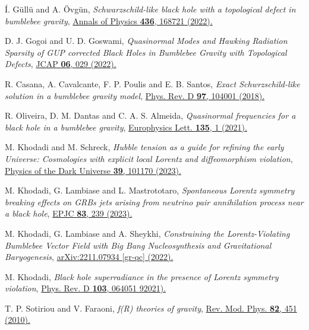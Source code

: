 \documentclass[aps,amsmath,amssymb,showpacs,showkeys]{revtex4}
\begin{document}
\begin{thebibliography}{99}
 \'I. G\"ull\"u and A. \"Ovg\"un, \textit{Schwarzschild-like black hole with a topological defect in bumblebee gravity}, \href{https://doi.org/10.1016/j.aop.2021.168721}{Annals of Physics \textbf{436}, 168721 (2022).}

D. J. Gogoi and U. D. Goswami, \textit{Quasinormal Modes and Hawking Radiation Sparsity of GUP corrected Black Holes in Bumblebee
Gravity with Topological Defects}, \href{https://iopscience.iop.org/article/10.1088/1475-7516/2022/06/029}{JCAP \textbf{06}, 029 (2022).}

R. Casana, A. Cavalcante, F. P. Poulis and E. B. Santos, \textit{Exact Schwrzschild-like solution in a bumblebee gravity model}, \href{https://doi.org/10.1103/PhysRevD.97.104001}{Phys. Rev. D \textbf{97}, 104001 (2018).}

R. Oliveira, D. M. Dantas and C. A. S. Almeida, \textit{Quasinormal frequencies for a black hole in a bumblebee gravity}, \href{https://iopscience.iop.org/article/10.1209/0295-5075/ac130c/pdf}{Europhysics Lett. \textbf{135}, 1 (2021).}


M. Khodadi and M. Schreck, \textit{Hubble tension as a guide for refining the early Universe: Cosmologies with explicit local Lorentz and diffeomorphism violation}, \href{https://www.sciencedirect.com/science/article/abs/pii/S2212686423000043?via%3Dihub}{Physics of the Dark Universe \textbf{39}, 101170 (2023).}

M. Khodadi, G. Lambiase and L. Mastrototaro, \textit{Spontaneous Lorentz symmetry breaking effects on GRBs jets arising from neutrino pair annihilation process near a black hole}, \href{}{EPJC \textbf{83}, 239 (2023).}

M. Khodadi, G. Lambiase and A. Sheykhi, \textit{Constraining the Lorentz-Violating Bumblebee Vector Field with Big Bang Nucleosynthesis and Gravitational Baryogenesis}, \href{https://doi.org/10.48550/arXiv.2211.07934}{arXiv:2211.07934 [gr-qc] (2022).}

M. Khodadi, \textit{Black hole superradiance in the presence of Lorentz symmetry violation}, \href{https://journals.aps.org/prd/abstract/10.1103/PhysRevD.103.064051}{Phys. Rev. D \textbf{103}, 064051 92021).}


T. P. Sotiriou and V. Faraoni, \textit{f(R) theories of gravity}, \href{https://journals.aps.org/rmp/abstract/10.1103/RevModPhys.82.451}{Rev. Mod. Phys. \textbf{82}, 451 (2010).}


\end{thebibliography}
\end{document}
